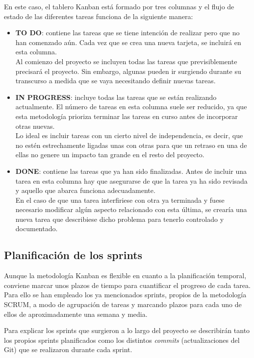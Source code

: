 En este caso, el tablero Kanban está formado por tres columnas y el flujo de estado de las diferentes tareas funciona de la siguiente manera:
\begin{itemize}
    \item \textbf{TO DO}: contiene las tareas que se tiene intención de realizar pero que no han comenzado aún. Cada vez que se crea una nueva tarjeta, se incluirá en esta columna.\\
    Al comienzo del proyecto se incluyen todas las tareas que previsiblemente precisará el proyecto. Sin embargo, algunas pueden ir surgiendo durante su transcurso a medida que se vaya necesitando definir nuevas tareas.
    \item \textbf{IN PROGRESS}: incluye todas las tareas que se están realizando actualmente. El número de tareas en esta columna suele ser reducido, ya que esta metodología prioriza terminar las tareas en curso antes de incorporar otras nuevas.\\ Lo ideal es incluir tareas con un cierto nivel de independencia, es decir, que no estén estrechamente ligadas unas con otras para que un retraso en una de ellas no genere un impacto tan grande en el resto del proyecto.
    \item \textbf{DONE}: contiene las tareas que ya han sido finalizadas. Antes de incluir una tarea en esta columna hay que asegurarse de que la tarea ya ha sido revisada y aquello que abarca funciona adecuadamente.\\
    En el caso de que una tarea interfiriese con otra ya terminada y fuese necesario modificar algún aspecto relacionado con esta última, se crearía una nueva tarea que describiese dicho problema para tenerlo controlado y documentado.
\end{itemize}
 
\subsection{Planificación de los sprints}
Aunque la metodología Kanban es flexible en cuanto a la planificación temporal, conviene marcar unos plazos de tiempo para cuantificar el progreso de cada tarea. Para ello se han empleado los ya mencionados sprints, propios de la metodología SCRUM, a modo de agrupación de tareas y marcando plazos para cada uno de ellos de aproximadamente una semana y media.

Para explicar los sprints que surgieron a lo largo del proyecto se describirán tanto los propios sprints planificados como los distintos \textit{commits} (actualizaciones del Git) que se realizaron durante cada sprint.
